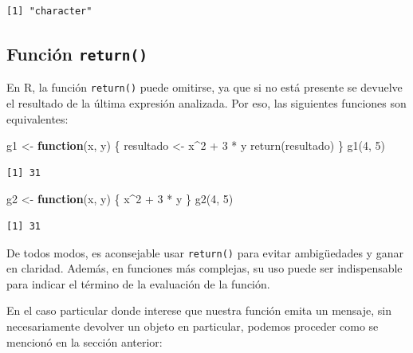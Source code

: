 \documentclass[
]{book}
\newenvironment{Shaded}{\begin{snugshade}}{\end{snugshade}}
\newcommand{\ControlFlowTok}[1]{\textcolor[rgb]{0.13,0.29,0.53}{\textbf{#1}}}
\newcommand{\DecValTok}[1]{\textcolor[rgb]{0.00,0.00,0.81}{#1}}
\newcommand{\FunctionTok}[1]{\textcolor[rgb]{0.00,0.00,0.00}{#1}}
\newcommand{\NormalTok}[1]{#1}
\newcommand{\OtherTok}[1]{\textcolor[rgb]{0.56,0.35,0.01}{#1}}
\newcommand{\SpecialCharTok}[1]{\textcolor[rgb]{0.00,0.00,0.00}{#1}}
\begin{document}
\begin{verbatim}
[1] "character"
\end{verbatim}

\hypertarget{funciuxf3n-return}{%
\subsection{\texorpdfstring{Función \texttt{return()}}{Función return()}}\label{funciuxf3n-return}}

En R, la función \texttt{return()} puede omitirse, ya que si no está presente se devuelve el resultado de la última expresión analizada. Por eso, las siguientes funciones son equivalentes:

\begin{Shaded}
\begin{Highlighting}[]
\NormalTok{g1 }\OtherTok{\textless{}{-}} \ControlFlowTok{function}\NormalTok{(x, y) \{}
\NormalTok{    resultado }\OtherTok{\textless{}{-}}\NormalTok{ x}\SpecialCharTok{\^{}}\DecValTok{2} \SpecialCharTok{+} \DecValTok{3} \SpecialCharTok{*}\NormalTok{ y}
    \FunctionTok{return}\NormalTok{(resultado)}
\NormalTok{\}}
\FunctionTok{g1}\NormalTok{(}\DecValTok{4}\NormalTok{, }\DecValTok{5}\NormalTok{)}
\end{Highlighting}
\end{Shaded}

\begin{verbatim}
[1] 31
\end{verbatim}

\begin{Shaded}
\begin{Highlighting}[]
\NormalTok{g2 }\OtherTok{\textless{}{-}} \ControlFlowTok{function}\NormalTok{(x, y) \{}
\NormalTok{    x}\SpecialCharTok{\^{}}\DecValTok{2} \SpecialCharTok{+} \DecValTok{3} \SpecialCharTok{*}\NormalTok{ y}
\NormalTok{\}}
\FunctionTok{g2}\NormalTok{(}\DecValTok{4}\NormalTok{, }\DecValTok{5}\NormalTok{)}
\end{Highlighting}
\end{Shaded}

\begin{verbatim}
[1] 31
\end{verbatim}

De todos modos, es aconsejable usar \texttt{return()} para evitar ambigüedades y ganar en claridad. Además, en funciones más complejas, su uso puede ser indispensable para indicar el término de la evaluación de la función.

En el caso particular donde interese que nuestra función emita un mensaje, sin necesariamente devolver un objeto en particular, podemos proceder como se mencionó en la sección anterior:
\end{document}
